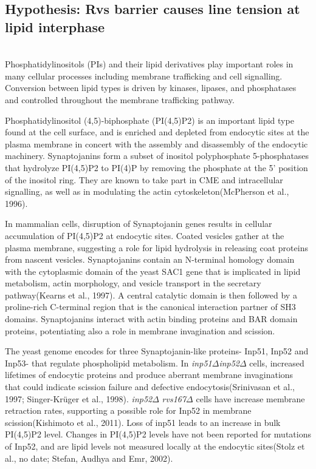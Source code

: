 \newpage
\subsection{Hypothesis: Rvs barrier causes line tension at lipid interphase}
			\mbox{}\\
Phosphatidylinositols (PIs) and their lipid derivatives play important roles in many cellular processes including membrane trafficking and cell signalling. Conversion between lipid types is driven by kinases, lipases, and phosphatases and controlled throughout the membrane trafficking pathway. 


\vspace{5mm}
Phosphatidylinositol (4,5)-biphosphate (PI(4,5)P2) is an important lipid type found at the cell surface, and is enriched and depleted from endocytic sites at the plasma membrane in concert with the assembly and disassembly of the endocytic machinery. Synaptojanins form a subset of inositol polyphosphate 5-phosphatases that hydrolyze PI(4,5)P2 to PI(4)P by removing the phosphate at the 5’ position of the inositol ring. They are known to take part in CME and intracellular signalling, as well as in modulating the actin cytoskeleton(McPherson et al., 1996). 


\vspace{5mm}
In mammalian cells, disruption of Synaptojanin genes results in cellular accumulation of PI(4,5)P2 at endocytic sites. Coated vesicles gather at the plasma membrane, suggesting a role for lipid hydrolysis in releasing coat proteins from nascent vesicles. Synaptojanins contain an N-terminal homology domain with the cytoplasmic domain of the yeast SAC1 gene that is implicated in lipid metabolism, actin morphology, and vesicle transport in the secretary pathway(Kearns et al., 1997). A central catalytic domain is then followed by a proline-rich C-terminal region that is the canonical interaction partner of SH3 domains. Synaptojanins interact with actin binding proteins and BAR domain proteins, potentiating also a role in membrane invagination and scission. 


\vspace{5mm}
The yeast genome encodes for three Synaptojanin-like proteins- Inp51, Inp52 and Inp53- that regulate phospholipid metabolism. In \textit{inp51$\Delta$}\textit{inp52$\Delta$}
 cells, increased lifetimes of endocytic proteins and produce aberrant membrane invaginations that could indicate scission failure and defective endocytosis(Srinivasan et al., 1997; Singer-Krüger et al., 1998). \textit{inp52$\Delta$} \textit{rvs167$\Delta$}
 cells have increase membrane retraction rates, supporting a possible role for Inp52 in membrane scission(Kishimoto et al., 2011). Loss of inp51 leads to an increase in bulk PI(4,5)P2 level. Changes in PI(4,5)P2 levels have not been reported for mutations of Inp52, and are lipid levels not measured locally at the endocytic sites(Stolz et al., no date; Stefan, Audhya and Emr, 2002).



